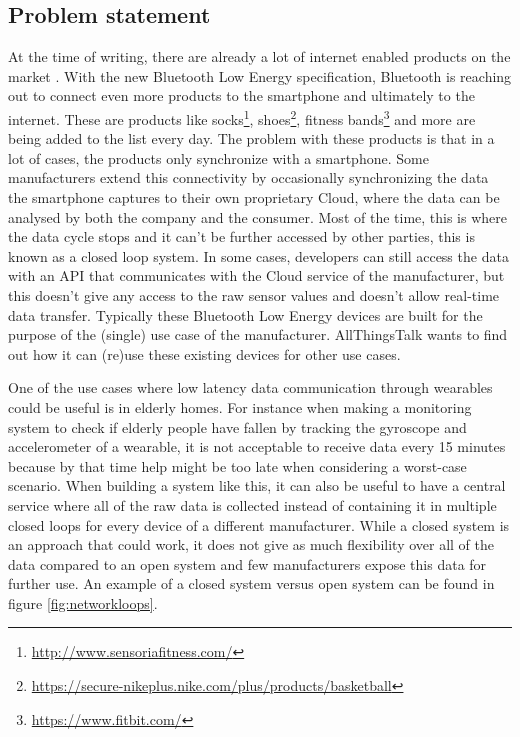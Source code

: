 \documentclass[pdftex,a4paper,12pt,twoside]{report}
\begin{document}
\subsection{Problem statement}
\label{subsec:problemstatement}
At the time of writing, there are already a lot of internet enabled products on the market \citep{gartner2015}. With the new Bluetooth Low Energy specification, Bluetooth is reaching out to connect even more products to the smartphone and ultimately to the internet. These are products like socks\footnote{\url{http://www.sensoriafitness.com/}}, shoes\footnote{\url{https://secure-nikeplus.nike.com/plus/products/basketball}}, fitness bands\footnote{\url{https://www.fitbit.com/}} and more are being added to the list every day. The problem with these products is that in a lot of cases, the products only synchronize with a smartphone. Some manufacturers extend this connectivity by occasionally synchronizing the data the smartphone captures to their own proprietary Cloud, where the data can be analysed by both the company and the consumer. Most of the time, this is where the data cycle stops and it can't be further accessed by other parties, this is known as a closed loop system. In some cases, developers can still access the data with an API that communicates with the Cloud service of the manufacturer, but this doesn't give any access to the raw sensor values and doesn't allow real-time data transfer. Typically these Bluetooth Low Energy devices are built for the purpose of the (single) use case of the manufacturer. AllThingsTalk wants to find out how it can (re)use these existing devices for other use cases.

One of the use cases where low latency data communication through wearables could be useful is in elderly homes. For instance when making a monitoring system to check if elderly people have fallen by tracking the gyroscope and accelerometer of a wearable, it is not acceptable to receive data every 15 minutes because by that time help might be too late when considering a worst-case scenario. When building a system like this, it can also be useful to have a central service where all of the raw data is collected instead of containing it in multiple closed loops for every device of a different manufacturer. While a closed system is an approach that could work, it does not give as much flexibility over all of the data compared to an open system and few manufacturers expose this data for further use. An example of a closed system versus open system can be found in figure \ref{fig:networkloops}.
\end{document}
